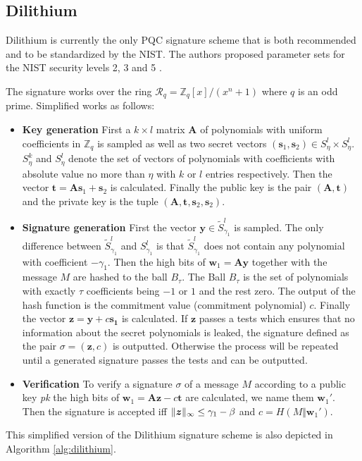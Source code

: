 \subsection{Dilithium}
\label{sec:explaindilith}
Dilithium is currently the only PQC signature scheme that is both recommended and to be standardized by the NIST. \cite{niststatus} The authors proposed parameter sets for the NIST security levels 2, 3 and 5 \cite[pp.~16--17]{dilithium_spec}.

The signature works over the ring $\mathcal{R}_q = \mathds{Z}_q[x]/(x^n+1)$ where $q$ is an odd prime. Simplified works as follows:
\begin{itemize}
    \item \textbf{Key generation} First a $k \times l$ matrix $\bm{A}$ of polynomials with uniform coefficients in $\mathds{Z}_q$ is sampled as well as two secret vectors $(\bm{s}_1, \bm{s}_2) \in S_\eta^l \times S_\eta^l$. $S_\eta^k$ and $S_\eta^l$ denote the set of vectors of polynomials with coefficients with absolute value no more than $\eta$ with $k$ or $l$ entries respectively.
    Then the vector $\bm{t} = \bm{A}\bm{s}_1 + \bm{s}_2$ is calculated.
    Finally the public key is the pair $(\bm{A}, \bm{t})$ and the private key is the tuple $(\bm{A}, \bm{t}, \bm{s}_2, \bm{s}_2)$.
    
    \item \textbf{Signature generation}
    First the vector $\bm{y} \in \tilde{S}_{\gamma_1}^l$ is sampled. The only difference between $\tilde{S}_{\gamma_1}^l$ and $S_{\gamma_1}^l$ is that $\tilde{S}_{\gamma_1}^l$ does not contain any polynomial with coefficient $-\gamma_1$.
    Then the high bits of $\bm{w}_1 = \bm{A}\bm{y}$ together with the message $M$ are hashed to the ball $B_\tau$. The Ball $B_\tau$ is the set of polynomials with exactly $\tau$ coefficients being $-1$ or $1$ and the rest zero. The output of the hash function is the commitment value (commitment polynomial) $c$.
    Finally the vector $\bm{z} = \bm{y} + c \bm{s_1}$ is calculated. If $\bm{z}$ passes a tests which ensures that no information about the secret polynomials is leaked, the signature defined as the pair $\sigma = (\bm{z}, c)$ is outputted. Otherwise the process will be repeated until a generated signature passes the tests and can be outputted.
    
    \item \textbf{Verification}
    To verify a signature $\sigma$ of a message $M$ according to a public key \textit{pk} the high bits of $\bm{w}_1 = \bm{A} \bm{z} - c \bm{t}$ are calculated, we name them $\bm{w}_1'$. Then the signature is accepted iff $\lVert\bm{z}\rVert_\infty \leq \gamma_1 - \beta$ and $c = H(M \Vert \bm{w}_1')$.
\end{itemize}
This simplified version of the Dilithium signature scheme is also depicted in Algorithm \ref{alg:dilithium}.

